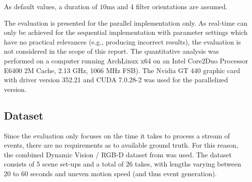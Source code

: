 As default values, a duration of $10\mathrm{ms}$ and 4 filter orientations are assumed.

The evaluation is presented for the parallel implementation only.
As real-time can only be achieved for the sequential implementation with parameter settings which have no practical relevances (e.g., producing incorrect results), the evaluation is not considered in the scope of this report.
The quantitative analysis was performed on a computer running ArchLinux x64 on an Intel Core2Duo Processor E6400 2M Cache, 2.13 GHz, 1066 MHz FSB).
The Nvidia GT 440 graphic card with driver version 352.21 and CUDA 7.0.28-2 was used for the parallelized version.

\subsection{Dataset}
Since the evaluation only focuses on the time it takes to process a stream of events, there are no requirements as to available ground truth.
For this reason, the combined Dynamic Vision / RGB-D dataset from \cite{weikersdorfer2014event} was used.
The dataset consists of 5 scene set-ups and a total of 26 takes, with lengths varying between 20 to 60 seconds and uneven motion speed (and thus event generation).

